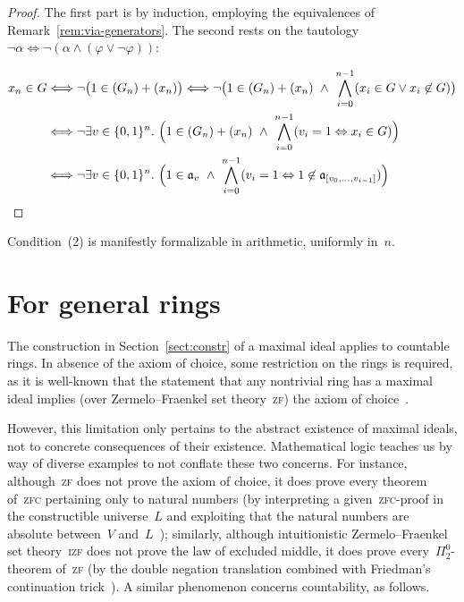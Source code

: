 \documentclass[envcountsect,envcountsame,runningheads]{llncs}
\newcommand{\aaa}{\mathfrak{a}}
\renewcommand{\_}{\mathpunct{.}\,}
\begin{document}
\begin{proof}The first part is by induction, employing the equivalences of
Remark~\ref{rem:via-generators}. The second rests on the tautology
$\neg\alpha \Longleftrightarrow \neg(\alpha \wedge (\varphi \vee \neg\varphi))$:

\vspace*{-1.2em}\small
\begin{align*}
  x_n \in G &
  \Longleftrightarrow \neg\bigl(1 \in (G_n) + (x_n)\bigr)
  \Longleftrightarrow \neg\bigl(1 \in (G_n) + (x_n) \ \wedge\ \bigwedge_{i=0}^{n-1} (x_i \in G \vee x_i \not\in G)\bigr) \\
  & \Longleftrightarrow \neg\exists v \in \{0,1\}^n\_
    \Bigl(1 \in (G_n) + (x_n) \ \wedge\ \bigwedge_{i=0}^{n-1} (v_i = 1
    \Leftrightarrow x_i \in G)\Bigr) \\
  & \Longleftrightarrow \neg\exists v \in \{0,1\}^n\_
    \Bigl(1 \in \aaa_v \ \wedge\ \bigwedge_{i=0}^{n-1} (v_i = 1
    \Leftrightarrow 1 \not\in \aaa_{[v_0,\ldots,v_{i-1}]})\Bigr) %
\end{align*}
\end{proof}

\noindent
Condition~(2) is manifestly formalizable in
arithmetic, uniformly in~$n$.


\section{For general rings}
\label{sect:wlog}

The construction in Section~\ref{sect:constr} of a maximal ideal applies to
countable rings. In absence of the axiom of choice, some restriction on the
rings is required, as it is well-known that the statement that any nontrivial
ring has a maximal ideal implies (over Zermelo--Fraenkel set
theory~\textsc{zf}) the axiom of choice~\cite{scott:prime-ideals,hodges:krull,banaschewski:krull,erne:krull,howard-rubin:ac}.

However, this limitation only pertains to the abstract existence of maximal
ideals, not to concrete consequences of their existence. Mathematical
logic teaches us by way of diverse examples to not conflate these two concerns. For
instance, although~\textsc{zf} does not prove the axiom of choice, it does
prove every theorem of~\textsc{zfc} pertaining only to natural numbers (by
interpreting a given~\textsc{zfc}-proof in the constructible universe~$L$
and exploiting that the natural numbers are absolute between~$V$
and~$L$~\cite{goedel:ac-gch,schoenfield:predicativity}); similarly, although intuitionistic Zermelo--Fraenkel set
theory~\textsc{izf} does not prove the law of excluded middle, it does prove
every~$\Pi^0_2$-theorem of~\textsc{zf} (by the double negation translation
combined with Friedman's continuation trick~\cite{friedman:double-negation-translation}).
A similar phenomenon concerns countability, as follows.
\end{document}
